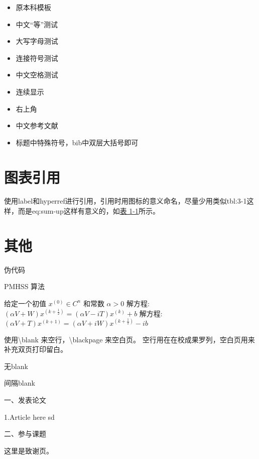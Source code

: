 \documentclass[AutoFakeBold]{LZUThesis-PgD&PhD}
\begin{document}
\begin{itemize}
    \item 原本科模板\cite{partl2016}
    \item 中文“等”测试\cite{partl2021}
    \item 大写字母测试\cite{partl2022-2}
    \item 连接符号测试\cite{partl2022-3}
    \item 中文空格测试\cite{partl2022}
    \item 连续显示\cite{partl2021,partl2022-2,partl2022-3}
    \item 右上角\cite{partl2016,partl2021,partl2022-2}
    \item 中文参考文献 \cite{李刚2006基于动态光谱的脉搏血氧测量精度分析}
    \item 标题中特殊符号，bib中双层大括号即可 \cite{PhysRevLett.108.024101}
\end{itemize}

\section{图表引用}


使用label和hyperref进行引用，引用时用图标的意义命名，尽量少用类似tbl:3-1这样，而是eq:sum-up这样有意义的，如\hyperref[tbl:mole]{表 1-1}所示。

\section{其他}


伪代码

\begin{algorithm}[H]
    \caption{PMHSS 算法\label{Alg:PMHSS}}
    \begin{algorithmic}[1]
        \State 给定一个初值 $ x^{(0)} \in C^{n} $  和常数 $\alpha>0$
        \State 解方程: $(\alpha V+W)x^{(k+\frac{1}{2})}=(\alpha V-i T)x^{(k)}+b $
        \State 解方程: $(\alpha V+T)x^{(k+1)}=(\alpha V+i W)x^{(k+\frac{1}{2})}-i b$
        \EndFor
    \end{algorithmic}
\end{algorithm}

使用\textbackslash blank 来空行，\textbackslash blackpage 来空白页。
空行用在在校成果罗列，空白页用来补充双页打印留白。

无blank

\blank

间隔blank
\blankpage




\backmatter


\printbib



\Achievements
一、发表论文

1.Article here sd

\blank

二、参与课题




\Thanks

这里是致谢页。
\end{document}
